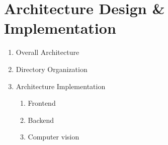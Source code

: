 \newcommand{\addImage}[2]{
    \begin{figure}[!htb]
        \begin{center}
            \texttt{[image: \#1]}
            \caption{#2} %
            \renewcommand{\thefigure}{\thesubsection.\arabic{figure}}
        \end{center}
    \end{figure}
}

\newpage
\section{\Large{Architecture Design \& Implementation}}

\begin{enumerate}[label=\arabic*]
    \item {\large{Overall Architecture}}\\

    \item {\large{Directory Organization}}\\
        

    \newpage
    \item {\large{Architecture Implementation}}\\
          \begin{enumerate}[label=\alph*]
              \item Frontend\\
                

                \newpage
              \item Backend\\
                

                \newpage
              \item Computer vision\\
                

          \end{enumerate}
\end{enumerate}